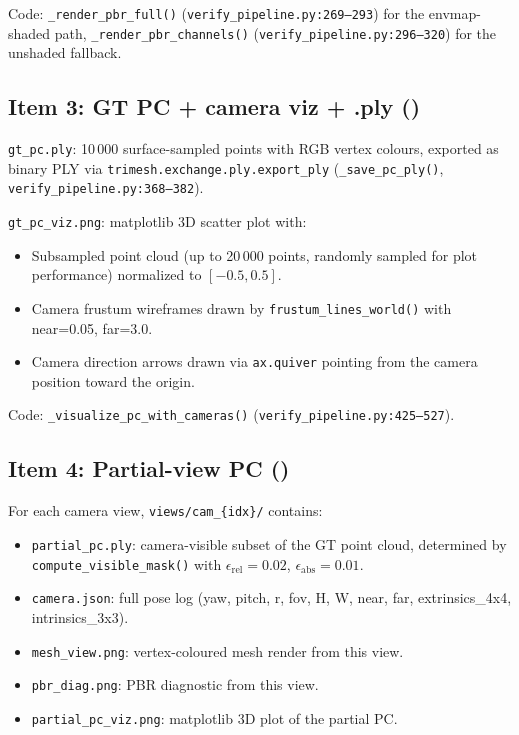 Code: \texttt{\_render\_pbr\_full()} (\texttt{verify\_pipeline.py:269--293})
for the envmap-shaded path, \texttt{\_render\_pbr\_channels()}
(\texttt{verify\_pipeline.py:296--320}) for the unshaded fallback.

\subsection{Item 3: GT PC + camera viz + .ply (\checkmark)}

\texttt{gt\_pc.ply}: 10\,000 surface-sampled points with RGB vertex colours,
exported as binary PLY via \texttt{trimesh.exchange.ply.export\_ply}
(\texttt{\_save\_pc\_ply()}, \texttt{verify\_pipeline.py:368--382}).

\texttt{gt\_pc\_viz.png}: matplotlib 3D scatter plot with:
\begin{itemize}
  \item Subsampled point cloud (up to 20\,000 points, randomly sampled for
  plot performance) normalized to $[-0.5, 0.5]$.
  \item Camera frustum wireframes drawn by \texttt{frustum\_lines\_world()}
  with near=0.05, far=3.0.
  \item Camera direction arrows drawn via \texttt{ax.quiver} pointing from
  the camera position toward the origin.
\end{itemize}

Code: \texttt{\_visualize\_pc\_with\_cameras()}
(\texttt{verify\_pipeline.py:425--527}).

\subsection{Item 4: Partial-view PC (\checkmark)}

For each camera view, \texttt{views/cam\_\{idx\}/} contains:
\begin{itemize}
  \item \texttt{partial\_pc.ply}: camera-visible subset of the GT point
  cloud, determined by \texttt{compute\_visible\_mask()} with
  $\epsilon_{\text{rel}} = 0.02$, $\epsilon_{\text{abs}} = 0.01$.
  \item \texttt{camera.json}: full pose log (yaw, pitch, r, fov, H, W,
  near, far, extrinsics\_4x4, intrinsics\_3x3).
  \item \texttt{mesh\_view.png}: vertex-coloured mesh render from this view.
  \item \texttt{pbr\_diag.png}: PBR diagnostic from this view.
  \item \texttt{partial\_pc\_viz.png}: matplotlib 3D plot of the partial PC.
\end{itemize}


